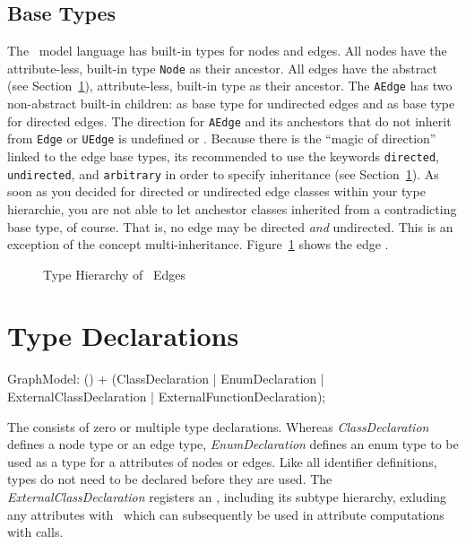 \subsection{Base Types}
\label{sct:basetypes}
The \GrG\ model language has built-in types for nodes and edges.
All nodes have the attribute-less, built-in type \texttt{Node} as their ancestor.
All edges have the abstract (see Section~\ref{typedecl}), attribute-less, built-in type \texttt{} as their ancestor.
The \texttt{AEdge} has two non-abstract built-in children: \texttt{} as base type for undirected edges and \texttt{} as base type for directed edges.
The direction for \texttt{AEdge} and its anchestors that do not inherit from \texttt{Edge} or \texttt{UEdge} is undefined or .
Because there is the ``magic of direction'' linked to the edge base types, its recommended to use the keywords \texttt{directed}, \texttt{undirected}, and \texttt{arbitrary} in order to specify inheritance (see Section~\ref{typedecl}).
As soon as you decided for directed or undirected edge classes within your type hierarchie, you are not able to let anchestor classes inherited from a contradicting base type, of course.
That is, no edge may be directed \emph{and} undirected.
This is an exception of the concept multi-inheritance.
Figure~\ref{fig:basetypes} shows the edge .
\begin{figure}[htbp]
	\centering
	
	\caption{Type Hierarchy of \GrG\ Edges}
	\label{fig:basetypes}
\end{figure}


\section{Type Declarations}
\label{typedecl}

\begin{rail}
  GraphModel: () + (ClassDeclaration
  									 | EnumDeclaration
  									 | ExternalClassDeclaration
  									 | ExternalFunctionDeclaration);
\end{rail}
The  consists of zero or multiple type declarations.
Whereas \emph{ClassDeclaration} defines a node type or an edge type, \emph{EnumDeclaration} defines an enum type to be used as a type for a attributes of nodes or edges.
Like all identifier definitions, types do not need to be declared before they are used.
The \emph{ExternalClassDeclaration} registers an , including its subtype hierarchy, exluding any attributes with \GrG~which can subsequently be used in attribute computations with  calls.

